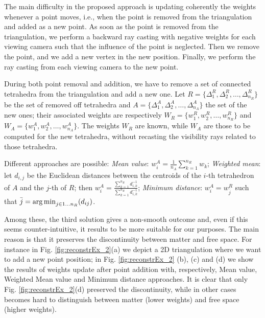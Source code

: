 The main difficulty in the proposed approach is updating coherently the weights whenever a point moves, i.e., when the point is removed from the triangulation and added as a new point. As soon as the point is removed from the triangulation, we perform a backward ray casting with negative weights for each viewing camera such that the influence of the point is neglected. Then we remove the point, and we add a new vertex in the new position. Finally, we perform the ray casting from each viewing camera to the new point.

During both point removal and addition, we have to remove a set of connected tetrahedra from the triangulation and add a new one. 
Let $R = \{\Delta_1^R, \Delta_2^R, \dots, \Delta_{n_R}^R\}$ be the set of removed off tetrahedra and $A = \{\Delta_1^A, \Delta_2^A, \dots, \Delta_{n_A}^A\}$ the set of the new ones; their associated weights are respectively $W_R = \{w_1^R, w_2^R, \dots, w_{n_R}^R\}$ and $W_A = \{w_1^A, w_2^A, \dots, w_{n_A}^A\}$. The weights $W_R$ are known, while $W_A$ are those to be computed for the new tetrahedra, without recasting the visibility rays related to those tetrahedra.

Different approaches are possible: \emph{Mean value}: $w_i^A = \frac{1}{n_A}\sum_{k=1}^{n_R} w_{k}$; \emph{Weighted mean}: let $d_{i,j}$ be the Euclidean distances between the centroids of the $i$-th tetrahedron of $A$ and the $j$-th of $R$; then $w_i^A = \frac{\sum_{k=1}^{n_R}d_{i,k}^{-1}}{\sum_{k=1}^{n_R}d_{i,k}^{-1}}$; \emph{Minimum distance}: $w_i^A = w_{\bar{j}}^R$ such that $\bar{j} = \operatorname*{arg\,min}_{j \in {1\dots n_R}}(d_{ij})$.

Among these, the third solution gives a non-smooth outcome and, even if this seems counter-intuitive, it results to be more suitable for our purposes. The main reason is that it preserves the discontinuity between matter and free space. For instance in Fig. \ref{fig:reconstrEx_2}(a) we depict a 2D triangulation where we want to add a new point position; in Fig. \ref{fig:reconstrEx_2} (b), (c) and (d) we show the results of weights update after point addition with, respectively, Mean value, Weighted Mean value and Minimum distance approaches. 
It is clear that only Fig. \ref{fig:reconstrEx_2}(d) preserved the discontinuity, while in other cases becomes hard to distinguish between matter (lower weights) and free space (higher weights). 


